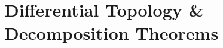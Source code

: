 \documentclass[../geometry_main.tex]{subfiles}
\begin{document}
\chapter{Differential Topology \& Decomposition Theorems}
\end{document}
